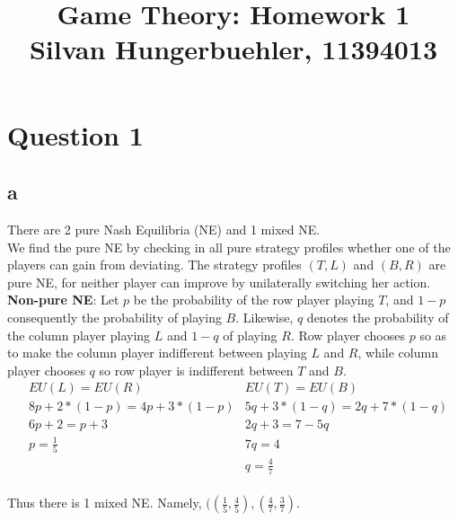 \documentclass[10pt,a4paper]{article}
\title{%
  Game Theory: Homework 1 \\
  \large Silvan Hungerbuehler, 11394013}
\date{}
\begin{document}
\maketitle

\section*{Question 1}
\subsection*{a}
There are 2 pure Nash Equilibria (NE) and 1 mixed NE.\\
We find the pure NE by checking in all pure strategy profiles whether one of the players can gain from deviating. The strategy profiles $(T,L)$ and $(B,R)$ are pure NE, for neither player can improve by unilaterally switching her action.\\
\textbf{Non-pure NE}:
Let $p$ be the probability of the row player playing $T$, and $1-p$ consequently the probability of playing $B$. Likewise, $q$ denotes the probability of the column player  playing $L$ and $1-q$ of playing $R$. Row player chooses $p$ so as to make the column player indifferent between playing $L$ and $R$, while column player chooses $q$ so row player is indifferent between $T$ and $B$.\\
\begin{align*}
&EU(L)=EU(R) &EU(T)=EU(B)\\
&8p + 2* (1-p)= 4p + 3* (1-p)              &5q + 3* (1-q)= 2q + 7* (1-q) \\
&6p + 2 = p+3 &2q + 3 = 7-5q \\
&p = \tfrac{1}{5} &7q = 4 \\
& &q = \tfrac{4}{7}
\end{align*}\\
Thus there is 1 mixed NE. Namely, $((\tfrac{1}{5},\tfrac{4}{5}),(\tfrac{4}{7},\tfrac{3}{7})$.
\end{document}
